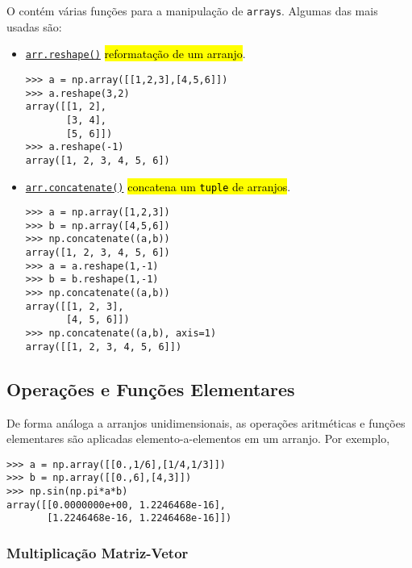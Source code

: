 O {\numpy} contém várias funções para a manipulação de \lstinline+arrays+. Algumas das mais usadas são:
\begin{itemize}
\item \href{https://numpy.org/doc/stable/reference/generated/numpy.reshape.html}{\lstinline+arr.reshape()+} \hl{reformatação de um arranjo}.

\begin{lstlisting}
>>> a = np.array([[1,2,3],[4,5,6]])
>>> a.reshape(3,2)
array([[1, 2],
       [3, 4],
       [5, 6]])
>>> a.reshape(-1)
array([1, 2, 3, 4, 5, 6])
\end{lstlisting}

\item \href{https://numpy.org/doc/stable/reference/generated/numpy.concatenate.html}{\lstinline+arr.concatenate()+} \hl{concatena um \texttt{tuple} de arranjos}.

\begin{lstlisting}
>>> a = np.array([1,2,3])
>>> b = np.array([4,5,6])
>>> np.concatenate((a,b))
array([1, 2, 3, 4, 5, 6])
>>> a = a.reshape(1,-1)
>>> b = b.reshape(1,-1)
>>> np.concatenate((a,b))
array([[1, 2, 3],
       [4, 5, 6]])
>>> np.concatenate((a,b), axis=1)
array([[1, 2, 3, 4, 5, 6]])
\end{lstlisting}

\end{itemize}

\subsection{Operações e Funções Elementares}

De forma análoga a arranjos unidimensionais, as operações aritméticas e funções elementares são aplicadas elemento-a-elementos em um arranjo. Por exemplo,

\begin{lstlisting}
>>> a = np.array([[0.,1/6],[1/4,1/3]])
>>> b = np.array([[0.,6],[4,3]])
>>> np.sin(np.pi*a*b)
array([[0.0000000e+00, 1.2246468e-16],
       [1.2246468e-16, 1.2246468e-16]])
\end{lstlisting}

\subsubsection{Multiplicação Matriz-Vetor}

